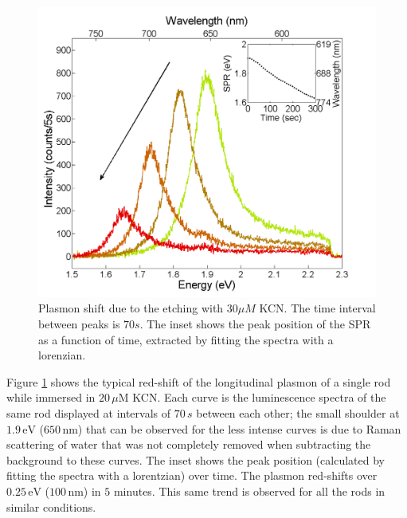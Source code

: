 \documentclass{article}
\begin{document}
\begin{figure}[p]
 \centering
 \includegraphics[width=0.95\linewidth]{plasmon_single_rod.png}
 \caption{Plasmon shift due to the etching with $30\mu M$ KCN. The time
 interval between peaks is $70s$. The inset shows the peak position of the SPR as a
 function of time, extracted by fitting the spectra with a lorenzian.}
 \label{fig:plasmon_single_rod}
\end{figure}

Figure \ref{fig:plasmon_single_rod} shows the typical red-shift of the
longitudinal plasmon of a single rod while immersed in $20\,\mu\textrm{M}$ KCN.
Each curve is the luminescence spectra of the same rod displayed at intervals of
$70\,s$ between each other; the small shoulder at $1.9\,\textrm{eV}$
($650\,\textrm{nm}$) that can be observed for the less intense curves is due to
Raman scattering of water that was not completely removed when subtracting the
background to these curves. The inset shows the peak position (calculated by
fitting the spectra with a lorentzian) over time. The plasmon red-shifts over
$0.25\,\textrm{eV}$ ($100\,\textrm{nm}$) in $5$ minutes. This same trend is
observed for all the rods in similar conditions.
\end{document}
